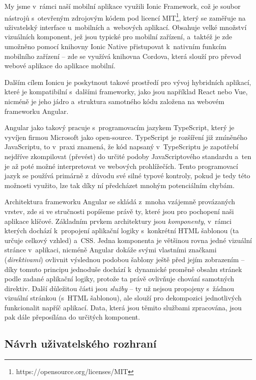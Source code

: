 My jsme v~rámci naší mobilní aplikace využili Ionic Framework, což je
soubor nástrojů s~otevřeným zdrojovým kódem pod licencí
MIT\footnote{https://opensource.org/licenses/MIT}, který se zaměřuje na
uživatelský interface u~mobilních a~webových aplikací. Obsahuje velké
množství vizuálních komponent, jež jsou typické pro mobilní zařízení,
a~taktéž je zde umožněno pomocí knihovny Ionic Native přistupovat
k~nativním funkcím mobilního zařízení -- zde se využívá knihovna Cordova,
která slouží pro převod webové aplikace do aplikace mobilní.
\parencite{cordova}

Dalším cílem Ionicu je poskytnout takové prostředí pro vývoj hybridních
aplikací, které je kompatibilní s~dalšími frameworky, jako jsou
například React nebo Vue, nicméně je jeho jádro a~struktura samotného
kódu založena na webovém frameworku Angular.~\parencite{ionic}

Angular jako takový pracuje s~programovacím jazykem TypeScript, který je
vyvíjen firmou Microsoft jako open-source. TypeScript je rozšíření již
zmíněného JavaScriptu, to v~praxi znamená, že kód napsaný v~TypeScriptu
je zapotřebí nejdříve zkompilovat (převést) do určité podoby
JavaScriptového standardu a~ten je až poté možné interpretovat ve
webových prohlížečích. Tento programovací jazyk se používá primárně
z~důvodu své silné typové kontroly, pokud je tedy této možnosti využito,
lze tak díky ní předcházet mnohým potenciálním chybám.
\parencite{typescript}

Architektura frameworku Angular se skládá z~mnoha vzájemně provázaných
vrstev, zde si ve stručnosti popíšeme právě ty, které jsou pro pochopení
naši aplikace klíčové. Základním prvkem architektury jsou
\emph{komponenty}, v~rámci kterých dochází k~propojení aplikační logiky
s~konkrétní HTML šablonou (ta určuje celkový vzhled) a~CSS. Jedna
komponenta je většinou rovna jedné vizuální stránce v~aplikaci, nicméně
Angular dokáže svými vlastními značkami (\emph{direktivami}) ovlivnit
výslednou podobou šablony ještě před jejím zobrazením -- díky tomuto
principu jednoduše dochází k~dynamické proměně obsahu stránek podle
zadané aplikační logiky, protože ta právě ovlivňuje chování samotných
direktiv. Další důležitou části jsou \emph{služby} -- ty už nejsou
propojeny s~žádnou vizuální stránkou (s~HTML šablonou), ale slouží pro
dekompozici jednotlivých funkcionalit napříč aplikací. Data, která jsou
těmito službami zpracována, jsou pak dále přeposílána do určitých
komponent.~\parencite{angulararchitecture}

\hypertarget{nuxe1vrh-uux17eivatelskuxe9ho-rozhranuxed}{%
\subsection{Návrh uživatelského
rozhraní}\label{nuxe1vrh-uux17eivatelskuxe9ho-rozhranuxed}}

